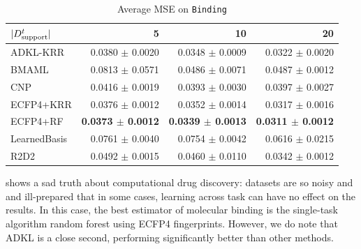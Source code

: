 \documentclass[11pt]{article}
\numberwithin{equation}{subsection}
\begin{document}
\begin{table}[ht]
  \centering
  \begin{tabular}{@{}lrrr@{}}
    \toprule
    $|{D_{\mathrm{support}}^t}|$ &               5  &               10 &               20 \\
    \midrule
    ADKL-KRR     &  0.0380 $\pm$ 0.0020 &  0.0348 $\pm$ 0.0009 &  0.0322 $\pm$ 0.0020 \\
    BMAML        &  0.0813 $\pm$ 0.0571 &  0.0486 $\pm$ 0.0071 &  0.0487 $\pm$ 0.0012 \\
    CNP          &  0.0416 $\pm$ 0.0019 &  0.0393 $\pm$ 0.0030 &  0.0397 $\pm$ 0.0027 \\
    ECFP4+KRR    &  0.0376 $\pm$ 0.0012 &  0.0352 $\pm$ 0.0014 &  0.0317 $\pm$ 0.0016 \\
    ECFP4+RF     &  \textbf{0.0373 $\pm$ 0.0012} &  \textbf{0.0339 $\pm$ 0.0013} &  \textbf{0.0311 $\pm$ 0.0012} \\
    LearnedBasis &  0.0761 $\pm$ 0.0040 &  0.0754 $\pm$ 0.0042 &  0.0616 $\pm$ 0.0215 \\
    R2D2         &  0.0492 $\pm$ 0.0015 &  0.0460 $\pm$ 0.0110 &  0.0342 $\pm$ 0.0012 \\
    \bottomrule
  \end{tabular}
  \caption{Average MSE on \texttt{Binding}}
  \label{tab:results-binding}
\end{table}

 shows a sad truth about computational drug discovery: datasets are so noisy and and ill-prepared that in some cases, learning across task can have no effect on the results. In this case, the best estimator of molecular binding is the single-task algorithm random forest using ECFP4 fingerprints. However, we do note that ADKL is a close second, performing significantly better than other methods.
\end{document}
